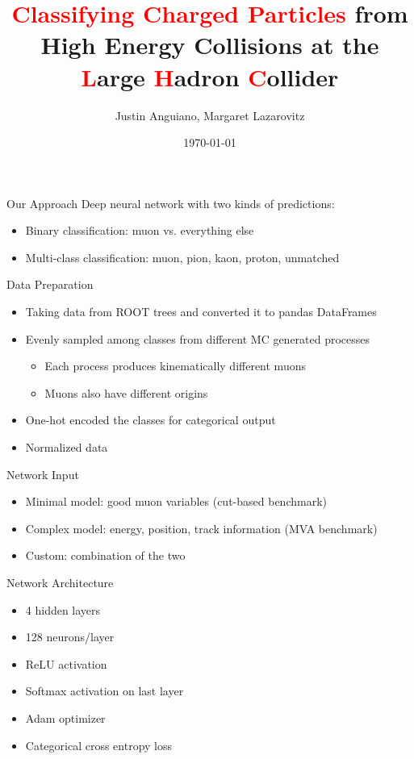 \documentclass[10pt,handout]{beamer}
\author{Justin Anguiano, Margaret Lazarovitz}
\title{\textcolor{red}{Classifying Charged Particles} from High Energy Collisions at the \textcolor{red}{L}arge \textcolor{red}{H}adron \textcolor{red}{C}ollider }
\institute{University of Kansas}
\date{\today}
\begin{document}






\begin{frame}{Our Approach}
Deep neural network with two kinds of predictions:
\begin{itemize}
\item Binary classification: muon vs. everything else
\item Multi-class classification: muon, pion, kaon, proton, unmatched
\end{itemize}
\end{frame}

\begin{frame}{Data Preparation}
\begin{itemize}
\item Taking data from ROOT trees and converted it to pandas DataFrames
\item Evenly sampled among classes from different MC generated processes
\begin{itemize}
\item Each process produces kinematically different muons
\item Muons also have different origins
\end{itemize}
\item One-hot encoded the classes for categorical output
\item Normalized data
\end{itemize}
\end{frame}

\begin{frame}{Network Input}
\begin{itemize}
\item Minimal model: good muon variables (cut-based benchmark)
\item Complex model: energy, position, track information (MVA benchmark)
\item Custom: combination of the two
\end{itemize}
\end{frame}



\begin{frame}{Network Architecture}
\begin{itemize}
\item 4 hidden layers
\item 128 neurons/layer
\item ReLU activation
\item Softmax activation on last layer
\item Adam optimizer
\item Categorical cross entropy loss
\end{itemize}
\end{frame}
\end{document}
